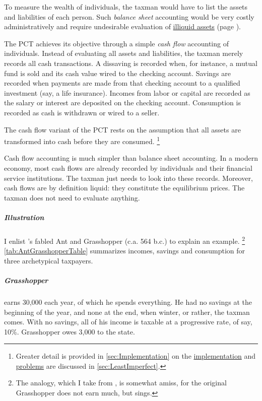To measure the wealth of individuals, the taxman would have to list the assets and liabilities of each person.
Such \emph{balance sheet} accounting would be very costly administratively and require undesirable evaluation of \hyperref[des:liquid-assets]{illiquid assets} (page \pageref{des:liquid-assets}).

The PCT achieves its objective through a simple \emph{cash flow} accounting of individuals.
Instead of evaluating all assets and liabilities, the taxman merely records all cash transactions.
A dissaving is recorded when, for instance, a mutual fund is sold and its cash value wired to the checking account.
Savings are recorded when payments are made from that checking account to a qualified investment (say, a life insurance).
Incomes from labor or capital are recorded as the salary or interest are deposited on the checking account.
Consumption is recorded as cash is withdrawn or wired to a seller.

The cash flow variant of the PCT rests on the assumption that all assets are transformed into cash before they are consumed.
\footnote{
	Greater detail is provided in \autoref{sec:Implementation} on the \hyperref[sec:Implementation]{implementation} and \hyperref[sec:LeastImperfect]{problems} are discussed in \autoref{sec:LeastImperfect}.
}

Cash flow accounting is much simpler than balance sheet accounting.
In a modern economy, most cash flows are already recorded by individuals and their financial service institutions.
The taxman just needs to look into these records.
Moreover, cash flows are by definition liquid:
they constitute the equilibrium prices.
The taxman does not need to evaluate anything.

\subparagraph{Illustration}
I enlist \citeauthor{Aesop}'s fabled Ant and Grasshopper (c.a.
564 b.c.) to explain an example.
\footnote{
	The analogy, which I take from \cite{McCaffery2005}, is somewhat amiss, for the original Grasshopper does not earn much, but sings.
}
\autoref{tab:AntGrasshopperTable} summarizes incomes, savings and consumption for three archetypical taxpayers.



\subparagraph{Grasshopper}
earns 30,000 each year, of which he spends everything.
He had no savings at the beginning of the year, and none at the end, when winter, or rather, the taxman comes.
With no savings, all of his income is taxable at a progressive rate, of say, 10\%.
Grasshopper owes 3,000 to the state.

